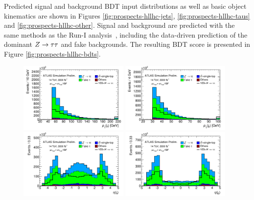 Predicted signal and background BDT input distributions as well as basic object kinematics are shown in Figures \cref{fig:prospects-hllhc-jets}, \cref{fig:prospects-hllhc-taus} and \cref{fig:prospects-hllhc-other}. Signal and background are predicted with the same methods as the Run-I analysis~\cite{HIGG-2013-32}, including the data-driven prediction of the dominant $Z\rightarrow\tau\tau$ and fake backgrounds. The resulting BDT score is presented in Figure \cref{fig:prospects-hllhc-bdts}.

\begin{figure}[tp]
  \centering
  \includegraphics[width=0.48\textwidth]{figures/ATL-PHYS-PUB-2014-018/fig_03a}
  \includegraphics[width=0.48\textwidth]{figures/ATL-PHYS-PUB-2014-018/fig_03b}
  \includegraphics[width=0.48\textwidth]{figures/ATL-PHYS-PUB-2014-018/fig_03c}
  \includegraphics[width=0.48\textwidth]{figures/ATL-PHYS-PUB-2014-018/fig_03d}

\end{figure}
